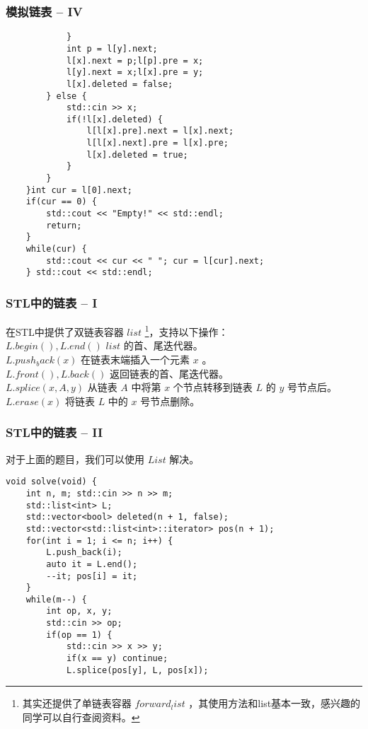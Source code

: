\documentclass{beamer}
\begin{document}
\begin{frame}[fragile]
\frametitle{模拟链表 -- IV}
\begin{onlyenv}
\begin{verbatim}
            }
            int p = l[y].next;
            l[x].next = p;l[p].pre = x;
            l[y].next = x;l[x].pre = y;
            l[x].deleted = false;
        } else {
            std::cin >> x;
            if(!l[x].deleted) {
                l[l[x].pre].next = l[x].next;
                l[l[x].next].pre = l[x].pre;
                l[x].deleted = true;
            }
        }
    }int cur = l[0].next;
    if(cur == 0) {
        std::cout << "Empty!" << std::endl;
        return;
    }
    while(cur) {
        std::cout << cur << " "; cur = l[cur].next;
    } std::cout << std::endl;
\end{verbatim}
\end{onlyenv}
\end{frame}
\begin{frame}
\frametitle{STL中的链表 -- I}
在STL中提供了双链表容器 $list$ \footnote{其实还提供了单链表容器 $forward_list$ ，其使用方法和list基本一致，感兴趣的同学可以自行查阅资料。}，支持以下操作：\\ 
$L.begin(), L.end()$ $list$ 的首、尾迭代器。 \\ 
$L.push_back(x)$ 在链表末端插入一个元素 $x$ 。\\ 
$L.front(), L.back()$ 返回链表的首、尾迭代器。 \\ 
$L.splice(x, A, y)$ 从链表 $A$ 中将第 $x$ 个节点转移到链表 $L$ 的 $y$ 号节点后。
$L.erase(x)$ 将链表 $L$ 中的 $x$ 号节点删除。
\end{frame}
\begin{frame}[fragile]
\frametitle{STL中的链表 -- II}
对于上面的题目，我们可以使用 $List$ 解决。
\begin{onlyenv}
\begin{verbatim}
void solve(void) {
    int n, m; std::cin >> n >> m;
    std::list<int> L;
    std::vector<bool> deleted(n + 1, false);
    std::vector<std::list<int>::iterator> pos(n + 1);
    for(int i = 1; i <= n; i++) {
        L.push_back(i);
        auto it = L.end();
        --it; pos[i] = it;
    }
    while(m--) {
        int op, x, y;
        std::cin >> op;
        if(op == 1) {
            std::cin >> x >> y;
            if(x == y) continue;
            L.splice(pos[y], L, pos[x]);
\end{verbatim}
\end{onlyenv}
\end{frame}
\end{document}
